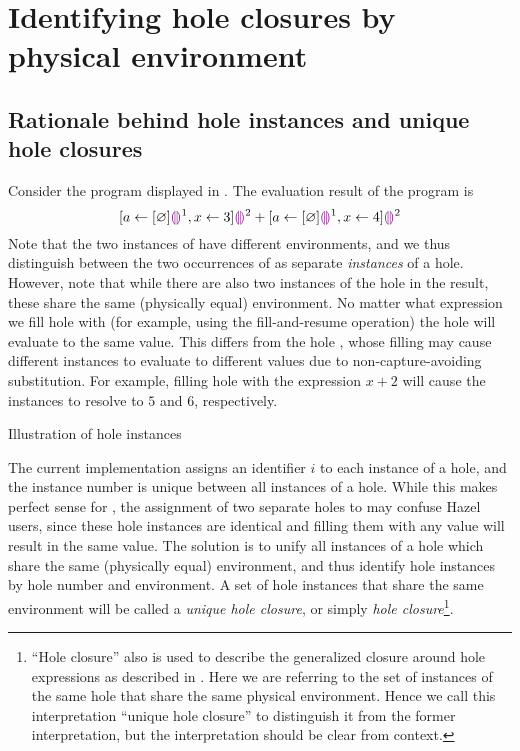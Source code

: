 \chapter{Identifying hole closures by physical environment}
\label{sec:renumbering}

\section{Rationale behind hole instances and unique hole closures}
\label{sec:instance-illustration}

Consider the program displayed in . The evaluation result of the program is \[
  [a\leftarrow[\varnothing]\textcolor{violet}{\llparenthesis}\textcolor{violet}{\rrparenthesis}^1,x\leftarrow 3]\textcolor{violet}{\llparenthesis}\textcolor{violet}{\rrparenthesis}^2
  + [a\leftarrow[\varnothing]\textcolor{violet}{\llparenthesis}\textcolor{violet}{\rrparenthesis}^1,x\leftarrow 4]\textcolor{violet}{\llparenthesis}\textcolor{violet}{\rrparenthesis}^2
\] Note that the two instances of  have different environments, and we thus distinguish between the two occurrences of  as separate \textit{instances} of a hole. However, note that while there are also two instances of the hole  in the result, these share the same (physically equal) environment. No matter what expression we fill hole  with (for example, using the fill-and-resume operation) the hole will evaluate to the same value. This differs from the hole , whose filling may cause different instances to evaluate to different values due to non-capture-avoiding substitution. For example, filling hole  with the expression $x+2$ will cause the instances to resolve to $5$ and $6$, respectively.

\begin{listing}
  \caption{Illustration of hole instances}
  \label{fig:instance-illustration}
\end{listing}

The current implementation assigns an identifier $i$ to each instance of a hole, and the instance number is unique between all instances of a hole. While this makes perfect sense for , the assignment of two separate holes to  may confuse Hazel users, since these hole instances are identical and filling them with any value will result in the same value. The solution is to unify all instances of a hole which share the same (physically equal) environment, and thus identify hole instances by hole number and environment. A set of hole instances that share the same environment will be called a \textit{unique hole closure}, or simply \textit{hole closure}\footnote{``Hole closure'' also is used to describe the generalized closure around hole expressions as described in . Here we are referring to the set of instances of the same hole that share the same physical environment. Hence we call this interpretation ``unique hole closure'' to distinguish it from the former interpretation, but the interpretation should be clear from context.}.

